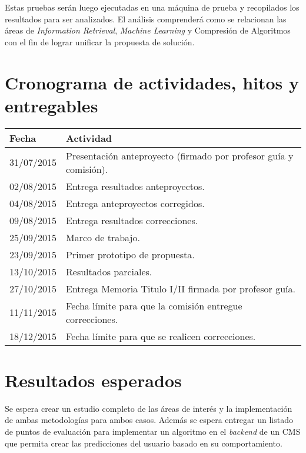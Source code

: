 \documentclass{udparticle}
\begin{document}
Estas pruebas serán luego ejecutadas en una máquina de prueba y recopilados los resultados para ser analizados.
El análisis comprenderá como se relacionan las áreas de \emph{Information Retrieval}, \emph{Machine Learning} y Compresión de Algoritmos con el fin de lograr unificar la propuesta de solución. 

\section{Cronograma de actividades, hitos y entregables}
  \begin{center}
  \begin{tabular}{ll}
  \hline\noalign{\smallskip}
  Fecha & Actividad \\
  \hline\noalign{\smallskip}
  31/07/2015 & Presentación anteproyecto (firmado por profesor guía y comisión).\\
  02/08/2015 & Entrega resultados anteproyectos.\\
  04/08/2015 & Entrega anteproyectos corregidos.\\
  09/08/2015 & Entrega resultados correcciones.\\
  25/09/2015 & Marco de trabajo.\\
  23/09/2015 & Primer prototipo de propuesta.\\
  13/10/2015 & Resultados parciales.\\
  27/10/2015 & Entrega Memoria Titulo I/II firmada por profesor guía.\\
  11/11/2015 & Fecha límite para que la comisión entregue correcciones.\\
  18/12/2015 & Fecha límite para que se realicen correcciones.\\
  \hline
  \end{tabular}
  \end{center}


\section{Resultados esperados}

Se espera crear un estudio completo de las áreas de interés y la implementación de ambas metodologías para ambos casos.
Además se espera entregar un listado de puntos de evaluación para implementar un algoritmo en el \emph{backend} de un CMS que permita crear las predicciones
del usuario basado en su comportamiento.

  
% 


 
\end{document}

